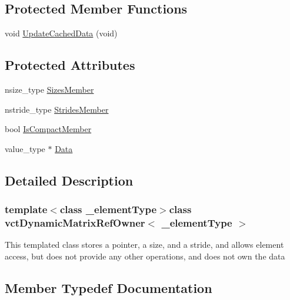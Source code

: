 \subsection*{Protected Member Functions}
\begin{DoxyCompactItemize}
\item 
void \hyperlink{classvct_dynamic_matrix_ref_owner_afd48cfac1a3604f1dd3b0cc09c1a8db4}{Update\+Cached\+Data} (void)
\end{DoxyCompactItemize}
\subsection*{Protected Attributes}
\begin{DoxyCompactItemize}
\item 
nsize\+\_\+type \hyperlink{classvct_dynamic_matrix_ref_owner_a5b7725d1ef65ac16c0360b94c09f4a01}{Sizes\+Member}
\item 
nstride\+\_\+type \hyperlink{classvct_dynamic_matrix_ref_owner_a90a7ffe471468b4df2e172b824e54b18}{Strides\+Member}
\item 
bool \hyperlink{classvct_dynamic_matrix_ref_owner_a80b9ceef73131dead623c3e86f4f22a4}{Is\+Compact\+Member}
\item 
value\+\_\+type $\ast$ \hyperlink{classvct_dynamic_matrix_ref_owner_a465f02e69e93e00a9fd586e4d89b6850}{Data}
\end{DoxyCompactItemize}


\subsection{Detailed Description}
\subsubsection*{template$<$class \+\_\+element\+Type$>$class vct\+Dynamic\+Matrix\+Ref\+Owner$<$ \+\_\+element\+Type $>$}

This templated class stores a pointer, a size, and a stride, and allows element access, but does not provide any other operations, and does not own the data 

\subsection{Member Typedef Documentation}
\hypertarget{classvct_dynamic_matrix_ref_owner_a7a8df19473cc2e95e25c4d1bf4bacbe4}{}

